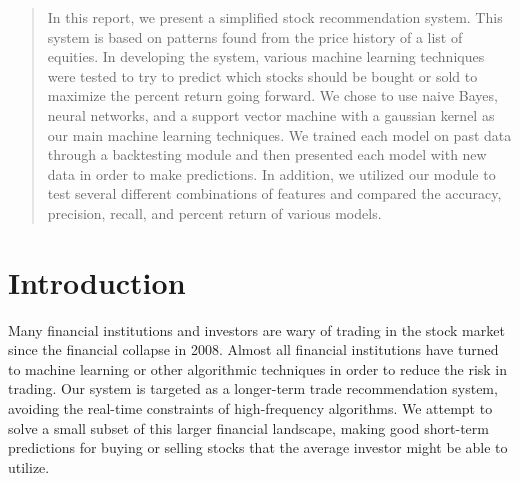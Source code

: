 \documentclass{article}
\begin{document}

\begin{abstract}
In this report, we present a simplified stock recommendation system. This system is based on patterns found from the price history of a list of equities. In developing the system, various machine learning techniques were tested to try to predict which stocks should be bought or sold to maximize the percent return going forward. We chose to use naive Bayes, neural networks, and a support vector machine with a gaussian kernel as our main machine learning techniques. We trained each model on past data through a backtesting module and then presented each model with new data in order to make predictions. In addition, we utilized our module to test several different combinations of features and compared the accuracy, precision, recall, and percent return of various models.
\end{abstract}

\section{Introduction}
Many financial institutions and investors are wary of trading in the stock market since the financial collapse in 2008.  Almost all financial institutions have turned to machine learning or other algorithmic techniques in order to reduce the risk in trading. Our system is targeted as a longer-term trade recommendation system, avoiding the real-time constraints of high-frequency algorithms. We attempt to solve a small subset of this larger financial landscape, making good short-term predictions for buying or selling stocks that the average investor might be able to utilize.
\end{document}
